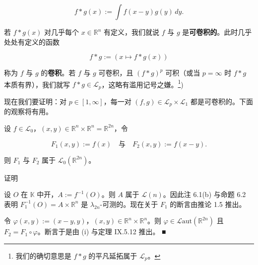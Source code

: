 \begin{remark}
\[
f * g(x) := \int f(x-y)g(y)\,dy .
\]

若 $ f * g(x) $ 对几乎每个 $ x \in \mathbb{R}^{n} $ 有定义，我们就说 $ f $ 与 $ g $ 是\textbf{可卷积的}。此时几乎处处有定义的函数

\[
f * g := (x \mapsto f * g(x))
\]

称为 $ f $ 与 $ g $ 的\textbf{卷积}。若 $ f $ 与 $ g $ 可卷积，且 $ (f * g)^{p} $ 可积（或当 $ p = \infty $ 时 $ f * g $ 本质有界），我们就写 $ f * g \in \mathcal{L}_{p} $，这略有滥用记号之嫌。\footnote{我们的确切意思是 $ f * g $ 的平凡延拓属于 $ \mathcal{L}_{p} $。})

现在我们要证明：对 $ p \in [1,\infty] $，每一对 $ (f,g) \in \mathcal{L}_{p} \times \mathcal{L}_{1} $ 都是可卷积的。下面的观察将有用。

\end{remark}

\begin{lemma}

设 $ f \in \mathcal{L}_{0} $，$ (x,y) \in \mathbb{R}^{n} \times \mathbb{R}^{n} = \mathbb{R}^{2n} $，令

\[
F_{1}(x,y) := f(x) \quad \text{与} \quad F_{2}(x,y) := f(x-y) .
\]

则 $ F_{1} $ 与 $ F_{2} $ 属于 $ \mathcal{L}_{0}(\mathbb{R}^{2n}) $。

证明

\begin{subitems}
\item

设 $ O $ 在 $ \mathbb{K} $ 中开，$ A := f^{-1}(O) $。则 $ A $ 属于 $ \mathcal{L}(n) $。因此注 6.1(b) 与命题 6.2 表明 $ F_{1}^{-1}(O) = A \times \mathbb{R}^{n} $ 是 $ \lambda_{2n} $-可测的。现在关于 $ F_{1} $ 的断言由推论 1.5 推出。

\item

令 $ \varphi(x,y) := (x-y,y) $，$ (x,y) \in \mathbb{R}^{n} \times \mathbb{R}^{n} $。则 $ \varphi \in \mathcal{L}\mathrm{aut}(\mathbb{R}^{2n}) $ 且 $ F_{2} = F_{1} \circ \varphi $。断言于是由 (i) 与定理 IX.5.12 推出。 \nobreak\hspace{0.35em}■

\end{subitems}

\end{lemma}

